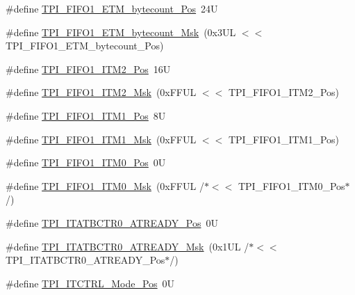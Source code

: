 \begin{DoxyCompactItemize}
\item 
\#define \hyperlink{group___c_m_s_i_s___t_p_i_gaab31238152b5691af633a7475eaf1f06}{T\+P\+I\+\_\+\+F\+I\+F\+O1\+\_\+\+E\+T\+M\+\_\+bytecount\+\_\+\+Pos}~24U
\item 
\#define \hyperlink{group___c_m_s_i_s___t_p_i_gab554305459953b80554fdb1908b73291}{T\+P\+I\+\_\+\+F\+I\+F\+O1\+\_\+\+E\+T\+M\+\_\+bytecount\+\_\+\+Msk}~(0x3\+U\+L $<$$<$ T\+P\+I\+\_\+\+F\+I\+F\+O1\+\_\+\+E\+T\+M\+\_\+bytecount\+\_\+\+Pos)
\item 
\#define \hyperlink{group___c_m_s_i_s___t_p_i_ga1828c228f3940005f48fb8dd88ada35b}{T\+P\+I\+\_\+\+F\+I\+F\+O1\+\_\+\+I\+T\+M2\+\_\+\+Pos}~16U
\item 
\#define \hyperlink{group___c_m_s_i_s___t_p_i_gae54512f926ebc00f2e056232aa21d335}{T\+P\+I\+\_\+\+F\+I\+F\+O1\+\_\+\+I\+T\+M2\+\_\+\+Msk}~(0x\+F\+F\+U\+L $<$$<$ T\+P\+I\+\_\+\+F\+I\+F\+O1\+\_\+\+I\+T\+M2\+\_\+\+Pos)
\item 
\#define \hyperlink{group___c_m_s_i_s___t_p_i_gaece86ab513bc3d0e0a9dbd82258af49f}{T\+P\+I\+\_\+\+F\+I\+F\+O1\+\_\+\+I\+T\+M1\+\_\+\+Pos}~8U
\item 
\#define \hyperlink{group___c_m_s_i_s___t_p_i_ga3347f42828920dfe56e3130ad319a9e6}{T\+P\+I\+\_\+\+F\+I\+F\+O1\+\_\+\+I\+T\+M1\+\_\+\+Msk}~(0x\+F\+F\+U\+L $<$$<$ T\+P\+I\+\_\+\+F\+I\+F\+O1\+\_\+\+I\+T\+M1\+\_\+\+Pos)
\item 
\#define \hyperlink{group___c_m_s_i_s___t_p_i_ga2188671488417a52abb075bcd4d73440}{T\+P\+I\+\_\+\+F\+I\+F\+O1\+\_\+\+I\+T\+M0\+\_\+\+Pos}~0U
\item 
\#define \hyperlink{group___c_m_s_i_s___t_p_i_ga8ae09f544fc1a428797e2a150f14a4c9}{T\+P\+I\+\_\+\+F\+I\+F\+O1\+\_\+\+I\+T\+M0\+\_\+\+Msk}~(0x\+F\+F\+U\+L /$\ast$$<$$<$ T\+P\+I\+\_\+\+F\+I\+F\+O1\+\_\+\+I\+T\+M0\+\_\+\+Pos$\ast$/)
\item 
\#define \hyperlink{group___c_m_s_i_s___t_p_i_gab1eb6866c65f02fa9c83696b49b0f346}{T\+P\+I\+\_\+\+I\+T\+A\+T\+B\+C\+T\+R0\+\_\+\+A\+T\+R\+E\+A\+D\+Y\+\_\+\+Pos}~0U
\item 
\#define \hyperlink{group___c_m_s_i_s___t_p_i_gaee320b3c60f9575aa96a8742c4ff9356}{T\+P\+I\+\_\+\+I\+T\+A\+T\+B\+C\+T\+R0\+\_\+\+A\+T\+R\+E\+A\+D\+Y\+\_\+\+Msk}~(0x1\+U\+L /$\ast$$<$$<$ T\+P\+I\+\_\+\+I\+T\+A\+T\+B\+C\+T\+R0\+\_\+\+A\+T\+R\+E\+A\+D\+Y\+\_\+\+Pos$\ast$/)
\item 
\#define \hyperlink{group___c_m_s_i_s___t_p_i_gaa847adb71a1bc811d2e3190528f495f0}{T\+P\+I\+\_\+\+I\+T\+C\+T\+R\+L\+\_\+\+Mode\+\_\+\+Pos}~0U
\item 
$$
\end{DoxyCompactItemize}
